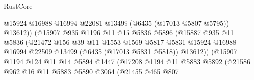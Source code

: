 \begin{lexlean}{RustCore}
\begin{coremodule}
                                        @15924
                                        @16988
                                        @16994
                                        @22081
                                        @13499
                                        (@6435 (@17013 @5807 @5795))
                                        @13612))
                                    (@15907
                                      @935
                                      @1196
                                      @11
                                      @15
                                      @5836
                                      @5896
                                      (@15887
                                        @935
                                        @11
                                        @5836
                                        (@21472
                                          @156
                                          @39
                                          @11
                                          @1553
                                          @1569
                                          @5817
                                          @5831
                                          @15924
                                          @16988
                                          @16994
                                          @22509
                                          @13499
                                          (@6435 (@17013 @5831 @5818))
                                          @13612))
                                      (@15907
                                        @1194
                                        @124
                                        @11
                                        @14
                                        @5894
                                        @1447
                                        (@17208
                                          @1194
                                          @11
                                          @5883
                                          @5892
                                          (@21586
                                            @962
                                            @16
                                            @11
                                            @5883
                                            @5890
                                            @3064
                                            (@21455
                                              @465
                                              @807

\end{coremodule}
\end{lexlean}
